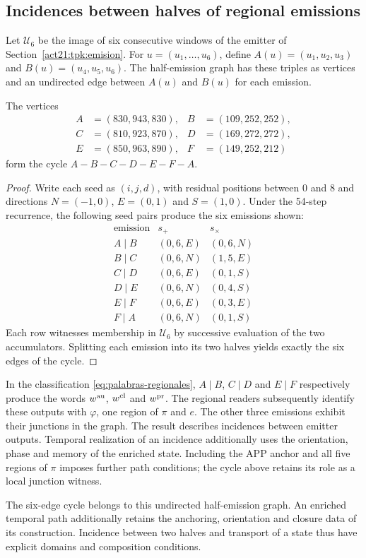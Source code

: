 \subsection{Incidences between halves of regional emissions}
\label{sec:rec27-empalmes}

Let $\mathcal U_6$ be the image of six consecutive windows of the emitter
of Section~\ref{act21:tpk:emision}. For $u=(u_1,\ldots,u_6)$, define
$A(u)=(u_1,u_2,u_3)$ and $B(u)=(u_4,u_5,u_6)$.
The half-emission graph has these triples as vertices and an undirected
edge between $A(u)$ and $B(u)$ for each emission.

\begin{proposition}
The vertices
\[
\begin{aligned}
A&=(830,943,830),&B&=(109,252,252),\\
C&=(810,923,870),&D&=(169,272,272),\\
E&=(850,963,890),&F&=(149,252,212)
\end{aligned}
\]
form the cycle $A-B-C-D-E-F-A$.
\end{proposition}
\begin{proof}
Write each seed as $(i,j,d)$, with residual positions between $0$ and $8$
and directions $N=(-1,0)$, $E=(0,1)$ and $S=(1,0)$.
Under the 54-step recurrence, the following seed pairs produce the six
emissions shown:
\[
\begin{array}{c|c|c}
\text{emission}&s_+&s_\times\\\hline
A\mid B&(0,6,E)&(0,6,N)\\
B\mid C&(0,6,N)&(1,5,E)\\
C\mid D&(0,6,E)&(0,1,S)\\
D\mid E&(0,6,N)&(0,4,S)\\
E\mid F&(0,6,E)&(0,3,E)\\
F\mid A&(0,6,N)&(0,1,S)
\end{array}
\]
Each row witnesses membership in $\mathcal U_6$ by successive evaluation
of the two accumulators. Splitting each emission into its two halves yields
exactly the six edges of the cycle.
\end{proof}

In the classification \eqref{eq:palabras-regionales},
\(A\mid B\), \(C\mid D\) and \(E\mid F\) respectively produce
the words \(w^{\rm au}\), \(w^{\rm cl}\) and \(w^{\rm pr}\).
The regional readers subsequently identify these outputs with
\(\varphi\), one region of \(\pi\) and \(e\).
The other three emissions exhibit their junctions in the graph.
The result describes incidences between emitter outputs. Temporal
realization of an incidence additionally uses the orientation, phase and
memory of the enriched state. Including the APP anchor and all five regions
of $\pi$ imposes further path conditions; the cycle above retains its role
as a local junction witness.

The six-edge cycle belongs to this undirected half-emission graph.
An enriched temporal path additionally retains the anchoring, orientation
and closure data of its construction. Incidence between two halves and
transport of a state thus have explicit domains and composition
conditions.
